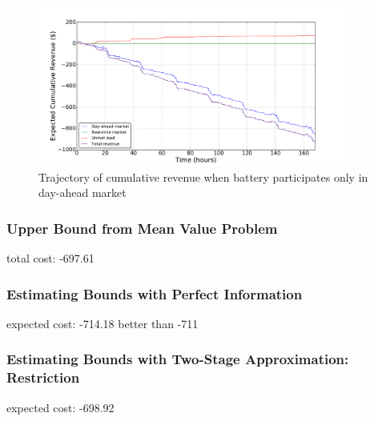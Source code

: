 \documentclass[11pt,twoside]{article}
\begin{document}
\begin{figure}[h!]
\begin{center}
\includegraphics[width=4in]
{Figures/Plots/onlydam/cumulative_rev_fp_st.pdf} \caption{Trajectory of cumulative revenue when battery participates only in day-ahead market}\label{fig:cumulative_rev_onlydam}\end{center}
\end{figure}


\subsubsection{Upper Bound from Mean Value Problem}
total cost: -697.61

\subsubsection{Estimating Bounds with Perfect Information}
expected cost: -714.18 better than -711

\subsubsection{Estimating Bounds with Two-Stage Approximation: Restriction}
expected cost: -698.92
\end{document}
